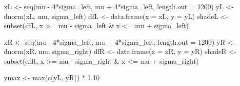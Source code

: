 \documentclass[
  letterpaper,
  DIV=11,
  numbers=noendperiod]{scrreprt}
\newenvironment{Shaded}{\begin{snugshade}}{\end{snugshade}}
\newcommand{\AttributeTok}[1]{\textcolor[rgb]{0.40,0.45,0.13}{#1}}
\newcommand{\DecValTok}[1]{\textcolor[rgb]{0.68,0.00,0.00}{#1}}
\newcommand{\FloatTok}[1]{\textcolor[rgb]{0.68,0.00,0.00}{#1}}
\newcommand{\FunctionTok}[1]{\textcolor[rgb]{0.28,0.35,0.67}{#1}}
\newcommand{\NormalTok}[1]{\textcolor[rgb]{0.00,0.23,0.31}{#1}}
\newcommand{\OtherTok}[1]{\textcolor[rgb]{0.00,0.23,0.31}{#1}}
\newcommand{\SpecialCharTok}[1]{\textcolor[rgb]{0.37,0.37,0.37}{#1}}
\begin{document}
\begin{Shaded}
\begin{Highlighting}[]
\NormalTok{xL }\OtherTok{\textless{}{-}} \FunctionTok{seq}\NormalTok{(mu }\SpecialCharTok{{-}} \DecValTok{4}\SpecialCharTok{*}\NormalTok{sigma\_left, mu }\SpecialCharTok{+} \DecValTok{4}\SpecialCharTok{*}\NormalTok{sigma\_left, }\AttributeTok{length.out =} \DecValTok{1200}\NormalTok{)}
\NormalTok{yL }\OtherTok{\textless{}{-}} \FunctionTok{dnorm}\NormalTok{(xL, mu, sigma\_left)}
\NormalTok{dfL }\OtherTok{\textless{}{-}} \FunctionTok{data.frame}\NormalTok{(}\AttributeTok{x =}\NormalTok{ xL, }\AttributeTok{y =}\NormalTok{ yL)}
\NormalTok{shadeL }\OtherTok{\textless{}{-}} \FunctionTok{subset}\NormalTok{(dfL, x }\SpecialCharTok{\textgreater{}=}\NormalTok{ mu }\SpecialCharTok{{-}}\NormalTok{ sigma\_left }\SpecialCharTok{\&}\NormalTok{ x }\SpecialCharTok{\textless{}=}\NormalTok{ mu }\SpecialCharTok{+}\NormalTok{ sigma\_left)}

\NormalTok{xR }\OtherTok{\textless{}{-}} \FunctionTok{seq}\NormalTok{(mu }\SpecialCharTok{{-}} \DecValTok{4}\SpecialCharTok{*}\NormalTok{sigma\_left, mu }\SpecialCharTok{+} \DecValTok{4}\SpecialCharTok{*}\NormalTok{sigma\_left, }\AttributeTok{length.out =} \DecValTok{1200}\NormalTok{)}
\NormalTok{yR }\OtherTok{\textless{}{-}} \FunctionTok{dnorm}\NormalTok{(xR, mu, sigma\_right)}
\NormalTok{dfR }\OtherTok{\textless{}{-}} \FunctionTok{data.frame}\NormalTok{(}\AttributeTok{x =}\NormalTok{ xR, }\AttributeTok{y =}\NormalTok{ yR)}
\NormalTok{shadeR }\OtherTok{\textless{}{-}} \FunctionTok{subset}\NormalTok{(dfR, x }\SpecialCharTok{\textgreater{}=}\NormalTok{ mu }\SpecialCharTok{{-}}\NormalTok{ sigma\_right }\SpecialCharTok{\&}\NormalTok{ x }\SpecialCharTok{\textless{}=}\NormalTok{ mu }\SpecialCharTok{+}\NormalTok{ sigma\_right)}

\NormalTok{ymax }\OtherTok{\textless{}{-}} \FunctionTok{max}\NormalTok{(}\FunctionTok{c}\NormalTok{(yL, yR)) }\SpecialCharTok{*} \FloatTok{1.10}


\end{Highlighting}
\end{Shaded}
\end{document}
